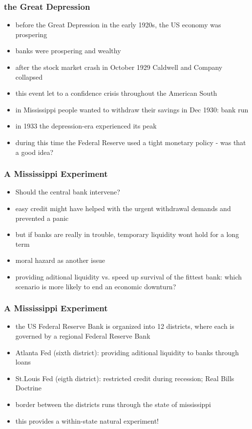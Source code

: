 \documentclass{beamer}
\begin{document}
\begin{frame}
\frametitle{the Great Depression}
\begin{itemize}
	\item before the Great Depression in the early 1920s, the US economy was prospering
	\item banks were prospering and wealthy
	\item after the stock market crash in October 1929 Caldwell and Company collapsed 
	\item this event let to a confidence crisis throughout the American South
	\item in Mississippi people wanted to withdraw their savings in Dec 1930: bank run
	\item in 1933 the depression-era experienced its peak
	\item during this time the Federal Reserve used a tight monetary policy - was that a good idea?
	
\end{itemize}

\end{frame}
\begin{frame}
\frametitle{A Mississippi Experiment}
\begin{itemize}
	\item Should the central bank intervene?
	\item easy credit might have helped with the urgent withdrawal demands and prevented a panic
	\item but if banks are really in trouble, temporary liquidity wont hold for a long term
	\item moral hazard as another issue
	\item providing aditional liquidity vs. speed up survival of the fittest bank: which scenario is more likely to end an economic downturn?
	
\end{itemize}

\end{frame}
\begin{frame}
\frametitle{A Mississippi Experiment}
\begin{itemize}
	\item the US Federal Reserve Bank is organized into 12 districts, where each is governed by a regional Federal Reserve Bank
	\item Atlanta Fed (sixth district): providing aditional liquidity to banks through loans 
	\item St.Louis Fed (eigth district): restricted credit during recession; Real Bills Doctrine
	\item border between the districts runs through the state of mississippi
	\item this provides a within-state natural experiment!
	
\end{itemize}

\end{frame}
\end{document}
